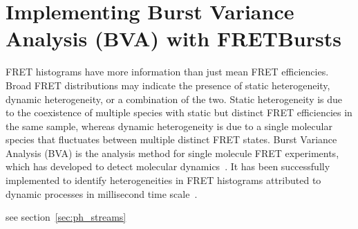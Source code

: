 \section{Implementing Burst Variance Analysis (BVA) with FRETBursts}

FRET histograms have more information than just mean FRET efficiencies. Broad FRET distributions may indicate the presence of static heterogeneity, dynamic heterogeneity, or a combination of the two. Static heterogeneity is due to the coexistence of multiple species with static but distinct FRET efficiencies in the same sample, whereas dynamic heterogeneity is due to a single molecular species that fluctuates between multiple distinct FRET states. Burst Variance Analysis (BVA) is the analysis method for single molecule FRET experiments, which has developed to detect molecular dynamics~\cite{Torella_2011}. It has been successfully implemented to identify heterogeneities in FRET histograms attributed to dynamic processes in millisecond time scale~\cite{Torella_2011, Robb_2013}.

see section~\ref{sec:ph_streams}